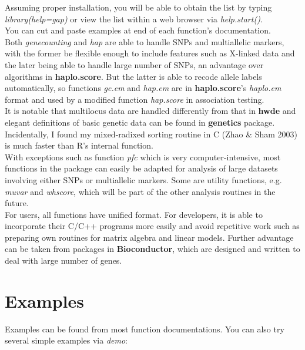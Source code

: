 \documentclass[10pt,a4paper]{article}
\begin{document}
Assuming proper installation, you will be able to obtain the list by typing
\textit{library(help=gap)} or view the list within a web browser via 
\textit{help.start()}.\\

You can cut and paste examples at end of each function's documentation.\\

Both \textit{genecounting} and \textit{hap} are able to handle SNPs and multiallelic
markers, with the former be flexible enough to include features such as X-linked data
and the later being able to handle large number of SNPs, an
advantage over algorithms in {\bf haplo.score}. But the latter is able to recode
allele labels automatically, so functions \textit{gc.em} and \textit{hap.em}
are in {\bf haplo.score}'s \textit{haplo.em} format and used by a modified function
\textit{hap.score} in association testing.\\

It is notable that multilocus data are handled differently from that in {\bf hwde} and
elegant definitions of basic genetic data can be found in {\bf genetics} package.\\

Incidentally, I found my mixed-radixed sorting routine in C (Zhao \& Sham 2003) is much
faster than R's internal function.\\

With exceptions such as function \textit{pfc} which is very computer-intensive, most
functions in the package can easily be adapted for analysis of large datasets involving
either SNPs or multiallelic markers. Some are utility functions, e.g. \textit{muvar}
and \textit{whscore}, which will be part of the other analysis routines in the future.\\

For users, all functions have unified format. For developers, it is able to incorporate
their C/C++ programs more easily and avoid repetitive work such as preparing own routines
for matrix algebra and linear models. Further advantage can be taken from packages in
{\bf Bioconductor}, which are designed and written to deal with large number of genes.


\section{Examples}

Examples can be found from most function documentations. You can also try several simple
examples via \textit{demo}:
\end{document}
